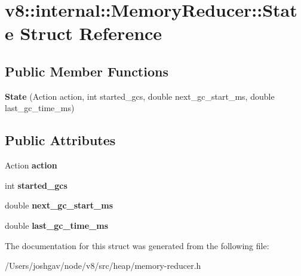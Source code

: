\hypertarget{structv8_1_1internal_1_1_memory_reducer_1_1_state}{}\section{v8\+:\+:internal\+:\+:Memory\+Reducer\+:\+:State Struct Reference}
\label{structv8_1_1internal_1_1_memory_reducer_1_1_state}
\subsection*{Public Member Functions}
\begin{DoxyCompactItemize}
\item 
{\bfseries State} (Action action, int started\+\_\+gcs, double next\+\_\+gc\+\_\+start\+\_\+ms, double last\+\_\+gc\+\_\+time\+\_\+ms)\hypertarget{structv8_1_1internal_1_1_memory_reducer_1_1_state_aad82ec7f29ecd150ff69c9982909cd6c}{}\label{structv8_1_1internal_1_1_memory_reducer_1_1_state_aad82ec7f29ecd150ff69c9982909cd6c}

\end{DoxyCompactItemize}
\subsection*{Public Attributes}
\begin{DoxyCompactItemize}
\item 
Action {\bfseries action}\hypertarget{structv8_1_1internal_1_1_memory_reducer_1_1_state_a6b6cb0e440ba7d62ee09acf63b455a0c}{}\label{structv8_1_1internal_1_1_memory_reducer_1_1_state_a6b6cb0e440ba7d62ee09acf63b455a0c}

\item 
int {\bfseries started\+\_\+gcs}\hypertarget{structv8_1_1internal_1_1_memory_reducer_1_1_state_a5de0dc251ae3308b6d54763f0c56402f}{}\label{structv8_1_1internal_1_1_memory_reducer_1_1_state_a5de0dc251ae3308b6d54763f0c56402f}

\item 
double {\bfseries next\+\_\+gc\+\_\+start\+\_\+ms}\hypertarget{structv8_1_1internal_1_1_memory_reducer_1_1_state_a390c46d6d670e8b8302d4ff1d2486c63}{}\label{structv8_1_1internal_1_1_memory_reducer_1_1_state_a390c46d6d670e8b8302d4ff1d2486c63}

\item 
double {\bfseries last\+\_\+gc\+\_\+time\+\_\+ms}\hypertarget{structv8_1_1internal_1_1_memory_reducer_1_1_state_aa28e5fde718c13fe4ad203bd370f3de5}{}\label{structv8_1_1internal_1_1_memory_reducer_1_1_state_aa28e5fde718c13fe4ad203bd370f3de5}

\end{DoxyCompactItemize}


The documentation for this struct was generated from the following file\+:\begin{DoxyCompactItemize}
\item 
/\+Users/joshgav/node/v8/src/heap/memory-\/reducer.\+h\end{DoxyCompactItemize}

